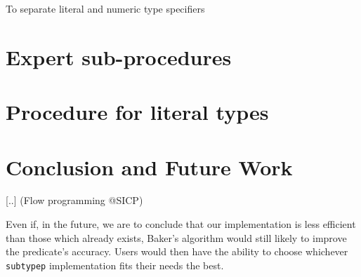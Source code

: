 \documentclass[format=sigconf]{acmart}
\newcommand\code[2][\small]{\sloppy\texttt{#1#2}}
\theoremstyle{definition}
\begin{document}
To separate literal and numeric type specifiers


\section{Expert sub-procedures}
\label{sec:exp}

\section{Procedure for literal types}

\section{Conclusion and Future Work}
[..] (Flow programming @SICP)

Even if, in the future, we are to conclude that our implementation is less
efficient than those which already exists, Baker's algorithm would still likely to
improve the predicate's accuracy. Users would then have the ability to
choose whichever \code{subtypep} implementation fits their needs the best.


\end{document}
